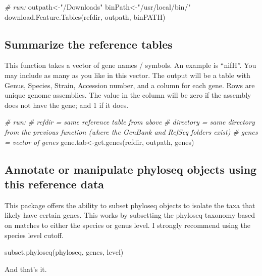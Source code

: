 \documentclass[
]{article}
\newenvironment{Shaded}{\begin{snugshade}}{\end{snugshade}}
\newcommand{\CommentTok}[1]{\textcolor[rgb]{0.56,0.35,0.01}{\textit{#1}}}
\newcommand{\FunctionTok}[1]{\textcolor[rgb]{0.00,0.00,0.00}{#1}}
\newcommand{\NormalTok}[1]{#1}
\newcommand{\OtherTok}[1]{\textcolor[rgb]{0.56,0.35,0.01}{#1}}
\newcommand{\StringTok}[1]{\textcolor[rgb]{0.31,0.60,0.02}{#1}}
\begin{document}
\begin{Shaded}
\begin{Highlighting}[]
\CommentTok{\# run:}
\NormalTok{outpath}\OtherTok{\textless{}{-}}\StringTok{"/Downloads"}
\NormalTok{binPath}\OtherTok{\textless{}{-}}\StringTok{"/usr/local/bin/"}
\FunctionTok{download.Feature.Tables}\NormalTok{(refdir, outpath, binPATH)}
\end{Highlighting}
\end{Shaded}

\hypertarget{summarize-the-reference-tables}{%
\subsection{Summarize the reference
tables}\label{summarize-the-reference-tables}}

This function takes a vector of gene names / symbols. An example is
``nifH''. You may include as many as you like in this vector. The output
will be a table with Genus, Species, Strain, Accession number, and a
column for each gene. Rows are unique genome assemblies. The value in
the column will be zero if the assembly does not have the gene; and 1 if
it does.

\begin{Shaded}
\begin{Highlighting}[]
\CommentTok{\# run:}
\CommentTok{\# refdir = same reference table from above}
\CommentTok{\# directory = same directory from the previous function (where the GenBank and RefSeq folders exist)}
\CommentTok{\# genes = vector of genes}
\NormalTok{gene.tab}\OtherTok{\textless{}{-}}\FunctionTok{get.genes}\NormalTok{(refdir, outpath, genes)}
\end{Highlighting}
\end{Shaded}

\hypertarget{annotate-or-manipulate-phyloseq-objects-using-this-reference-data}{%
\subsection{Annotate or manipulate phyloseq objects using this reference
data}\label{annotate-or-manipulate-phyloseq-objects-using-this-reference-data}}

This package offers the ability to subset phyloseq objects to isolate
the taxa that likely have certain genes. This works by subsetting the
phyloseq taxonomy based on matches to either the species or genus level.
I strongly recommend using the species level cutoff.

\begin{Shaded}
\begin{Highlighting}[]
\FunctionTok{subset.phyloseq}\NormalTok{(phyloseq, genes, level)}
\end{Highlighting}
\end{Shaded}

And that's it.
\end{document}
